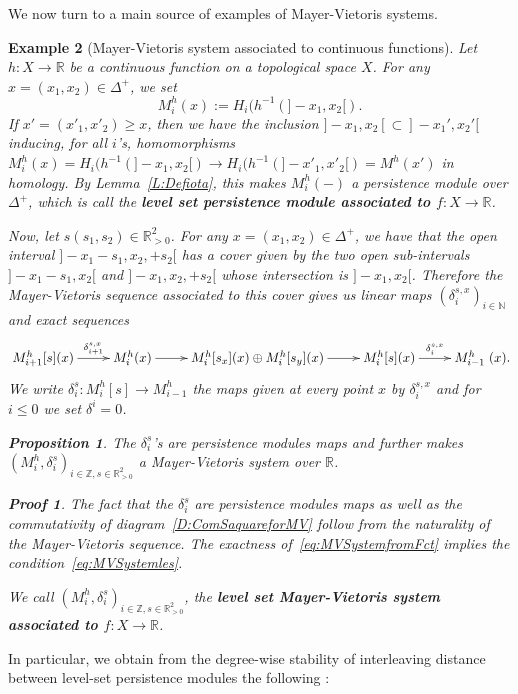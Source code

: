 \documentclass[a4paper, english, 11pt]{article}
\newcommand{\0}{\vec{0}}
\newcommand{\R}[0]{\mathbb{R}}
\newcommand{\N}[0]{\mathbb{N}}
\newcommand{\Z}[0]{\mathbb{Z}}
\newtheorem{prop}{Proposition}[section]
\newtheorem*{pf}{Proof} }
\newtheorem{ex}[prop]{Example}
\begin{document}
We now turn to a main source of examples of Mayer-Vietoris systems. 
\begin{ex}[Mayer-Vietoris system associated to continuous functions]\label{Ex:MVfromFct}
Let $h: X\to \R$ be a continuous function on a topological space $X$. For any $
x=(x_1,x_2)\in \Delta^+$, we 
 set $$M_i^h(x):= H_i(h^{-1}(]-x_1, x_2[).$$
 If $x'=(x'_1, x'_2)\geq x$, then we have the inclusion $]-x_1, x_2[\subset ]-x_1', x_2'[$ inducing, for all $i$'s, homomorphisms $M_i^h(x)=H_i(h^{-1}(]-x_1, x_2[) \to H_i(h^{-1}(]-x'_1, x'_2[)= M^h(x')$ in homology. 
 By Lemma~\ref{L:Defiota}, this makes $M_i^h(-)$ a persistence module over $\Delta^+$, which is call the \textbf{level set persistence module associated to $f:X\to \R$}. 
 
 \smallskip
 
 Now, let $s(s_1,s_2) \in \R^2_{>0}$. For any $x=(x_1,x_2)\in \Delta^+$, we have that the open interval $]-x_1-s_1, x_2,+s_2[ $ has a cover given by the two open sub-intervals $]-x_1-s_1, x_2[$ and $]-x_1, x_2,+s_2[ $ whose intersection is $]-x_1, x_2[$. Therefore the Mayer-Vietoris sequence associated to this cover gives us linear maps $(\delta_{i}^{s,x})_{i\in \N}$ and exact sequences 
  \begin{equation}\xymatrix{M^h_{i+1}[s](x) \ar[r]^-{\delta_{i+1}^{s,x}} & M^h_i(x) \ar[r] & M^h_i[s_x](x) \oplus M^h_i[s_y](x) \ar[r] & M^h_i[s](x) \ar[r]^-{\delta_{i}^{s,x}} & M^h_{i-1}}(x).\label{eq:MVSystemfromFct}\end{equation}
  We write $\delta^s_i: M_i^h[s] \to M_{i-1}^h$ the maps given at every point $x$ by $\delta_i^{s,x}$ and for $i\leq 0$ we set $\delta^i=0$.
  \begin{prop}\label{P:MVfromFct}
  The  $\delta^s_i$'s are persistence modules maps and further makes $(M^h_i, \delta^s_i)_{i\in \Z, s\in \R^2_{>0}}$ a Mayer-Vietoris system over $\R$.
  \end{prop}
  \begin{pf}
  The fact that the $\delta^s_i$ are persistence modules maps as well as the commutativity of diagram~\eqref{D:ComSaquareforMV} follow from the naturality of the Mayer-Vietoris sequence. The exactness of~\eqref{eq:MVSystemfromFct} implies the condition~\eqref{eq:MVSystemles}.
  \end{pf}
  We call  $(M^h_i, \delta^s_i)_{i\in \Z, s\in \R^2_{>0}}$, the \textbf{level set Mayer-Vietoris system associated to $f:X\to \R$}. 
\end{ex}


In particular, we obtain from the degree-wise stability of interleaving distance between level-set persistence modules the following : 
\end{document}
